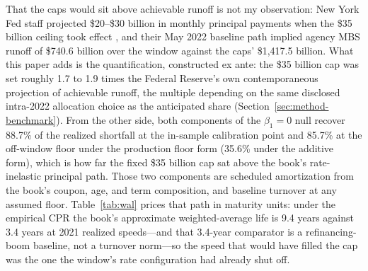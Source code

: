 \documentclass[12pt]{article}
\begin{document}
That the caps would sit above achievable runoff is not my observation: New York Fed staff projected \$20--\$30 billion in monthly principal payments when the \$35 billion ceiling took effect \citep{nyfed2022}, and their May 2022 baseline path implied agency MBS runoff of \$740.6 billion over the window against the caps' \$1{,}417.5 billion. What this paper adds is the quantification, constructed ex ante: the \$35 billion cap was set roughly 1.7 to 1.9 times the Federal Reserve's own contemporaneous projection of achievable runoff, the multiple depending on the same disclosed intra-2022 allocation choice as the anticipated share (Section~\ref{sec:method-benchmark}). From the other side, both components of the $\beta_1 = 0$ null recover 88.7\% of the realized shortfall at the in-sample calibration point and 85.7\% at the off-window floor under the production floor form (35.6\% under the additive form), which is how far the fixed \$35 billion cap sat above the book's rate-inelastic principal path. Those two components are scheduled amortization from the book's coupon, age, and term composition, and baseline turnover at any assumed floor. Table~\ref{tab:wal} prices that path in maturity units: under the empirical CPR the book's approximate weighted-average life is 9.4 years against 3.4 years at 2021 realized speeds---and that 3.4-year comparator is a refinancing-boom baseline, not a turnover norm---so the speed that would have filled the cap was the one the window's rate configuration had already shut off.
\end{document}
